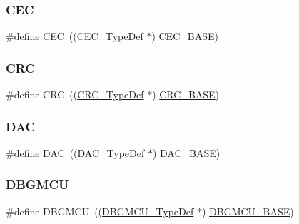 \subsubsection{\texorpdfstring{CEC}{CEC}}
{\footnotesize\ttfamily \#define C\+EC~((\mbox{\hyperlink{struct_c_e_c___type_def}{C\+E\+C\+\_\+\+Type\+Def}} $\ast$) \mbox{\hyperlink{group___peripheral__memory__map_gaacb77bc44b3f8c87ab98f241e760e440}{C\+E\+C\+\_\+\+B\+A\+SE}})}

\mbox{\label{group___peripheral__declaration_ga4381bb54c2dbc34500521165aa7b89b1}} 
\subsubsection{\texorpdfstring{CRC}{CRC}}
{\footnotesize\ttfamily \#define C\+RC~((\mbox{\hyperlink{struct_c_r_c___type_def}{C\+R\+C\+\_\+\+Type\+Def}} $\ast$) \mbox{\hyperlink{group___peripheral__memory__map_ga656a447589e785594cbf2f45c835ad7e}{C\+R\+C\+\_\+\+B\+A\+SE}})}

\mbox{\label{group___peripheral__declaration_ga4aa2a4ab86ce00c23035e5cee2e7fc7e}} 
\subsubsection{\texorpdfstring{DAC}{DAC}}
{\footnotesize\ttfamily \#define D\+AC~((\mbox{\hyperlink{struct_d_a_c___type_def}{D\+A\+C\+\_\+\+Type\+Def}} $\ast$) \mbox{\hyperlink{group___peripheral__memory__map_gad18d0b914c7f68cecbee1a2d23a67d38}{D\+A\+C\+\_\+\+B\+A\+SE}})}

\mbox{\label{group___peripheral__declaration_ga92ec6d9ec2251fda7d4ce09748cd74b4}} 
\subsubsection{\texorpdfstring{DBGMCU}{DBGMCU}}
{\footnotesize\ttfamily \#define D\+B\+G\+M\+CU~((\mbox{\hyperlink{struct_d_b_g_m_c_u___type_def}{D\+B\+G\+M\+C\+U\+\_\+\+Type\+Def}} $\ast$) \mbox{\hyperlink{group___peripheral__memory__map_ga4adaf4fd82ccc3a538f1f27a70cdbbef}{D\+B\+G\+M\+C\+U\+\_\+\+B\+A\+SE}})}

